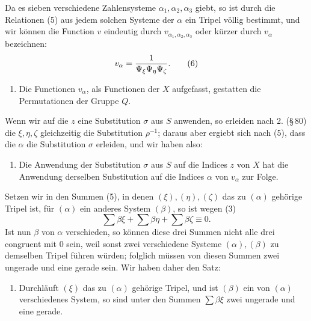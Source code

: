 \documentclass[11pt]{article}
\begin{document}
Da es sieben verschiedene Zahlensysteme $\alpha_1,\alpha_2,\alpha_3$ giebt, so ist durch die Relationen (5) aus jedem solchen Systeme der $\alpha$ ein Tripel völlig bestimmt, und wir können die Function $v$ eindeutig durch $v_{\alpha_1,\alpha_2,\alpha_3}$ oder kürzer durch $v_\alpha$ bezeichnen:
\begin{equation}
 v_\alpha={1\over \Psi_\xi\Psi_\eta\Psi_\zeta}.
 \tag{6}
\end{equation}
\begin{enumerate}[label=\arabic*.,leftmargin=2.8em,start=3]
\item Die Functionen $v_\alpha$, als Functionen der $X$ aufgefasst, gestatten die Permutationen der Gruppe $Q$.
\end{enumerate}
Wenn wir auf die $z$ eine Substitution $\sigma$ aus $S$ anwenden, so erleiden nach 2. (\S\,80) die $\xi,\eta,\zeta$ gleichzeitig die Substitution $\rho^{-1}$; daraus aber ergiebt sich nach (5), dass die $\alpha$ die Substitution $\sigma$ erleiden, und wir haben also:
\begin{enumerate}[label=\arabic*.,leftmargin=2.8em,start=4]
\item Die Anwendung der Substitution $\sigma$ aus $S$ auf die Indices $z$ von $X$ hat die Anwendung derselben Substitution auf die Indices $\alpha$ von $v_\alpha$ zur Folge.
\end{enumerate}

Setzen wir in den Summen (5), in denen $(\xi),(\eta),(\zeta)$ das zu $(\alpha)$ gehörige Tripel ist, für $(\alpha)$ ein anderes System $(\beta)$, so ist wegen (3)
\[
 \sum\beta\xi+\sum\beta\eta+\sum\beta\zeta\equiv 0.
\]
Ist nun $\beta$ von $\alpha$ verschieden, so können diese drei Summen nicht alle drei congruent mit $0$ sein, weil sonst zwei verschiedene Systeme $(\alpha),(\beta)$ zu demselben Tripel führen würden; folglich müssen von diesen Summen zwei ungerade und eine gerade sein. Wir haben daher den Satz:
\begin{enumerate}[label=\arabic*.,leftmargin=2.8em,start=5]
\item Durchläuft $(\xi)$ das zu $(\alpha)$ gehörige Tripel, und ist $(\beta)$ ein von $(\alpha)$ verschiedenes System, so sind unter den Summen $\sum\beta\xi$ zwei ungerade und eine gerade.
\end{enumerate}
\end{document}
